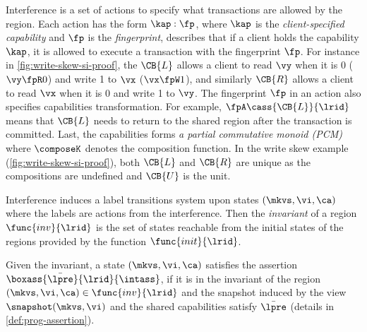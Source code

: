 Interference is a set of actions to specify what transactions are allowed by the region.
Each action has the form \( \kap : \fp \),
where \( \kap \) is the \emph{client-specified capability} and \( \fp \) is the \emph{fingerprint},
describes that if a client holds the capability \( \kap \), 
it is allowed to execute a transaction with the fingerprint \( \fp \).
For instance in \cref{fig:write-skew-si-proof}, 
the \( \CB{L}\) allows a client to read \( \vy \) when it is 0 (\(\vy \fpR 0\)) and write 1 to \( \vx \) (\(\vx \fpW 1\)),
and similarly \( \CB{R} \) allows a client to read \( \vx \) when it is 0 and write 1 to \( \vy \).
The fingerprint \( \fp \) in an action also specifies capabilities transformation.
For example, \( \null \fpA \cass{\CB{L}}{\lrid} \) means that \( \CB{L} \) needs to return to the shared region after the transaction is committed.
Last, the capabilities forms \emph{a partial commutative monoid (PCM)} where \( \composeK \) denotes the composition function.
In the write skew example (\cref{fig:write-skew-si-proof}), 
both \( \CB{L} \) and \( \CB{R} \) are unique as the compositions are undefined and \( \CB{U} \) is the unit.

Interference induces a label transitions system upon states \( (\mkvs, \vi, \ca) \)
where the labels are actions from the interference.
Then the \emph{invariant} of a region \( \func{inv}{\lrid} \) is the set of states reachable from 
the initial states of the regions provided by the function \( \func{init}{\lrid}\).

Given the invariant, a state \( (\mkvs, \vi, \ca) \) satisfies the assertion \( \boxass{\bar{\lpre}}{\lrid}{\intass} \),
if it is in the invariant of the region \( (\mkvs, \vi, \ca) \in \func{inv}{\lrid} \) and the snapshot induced by the view \( \snapshot(\mkvs, \vi) \) and 
the shared capabilities satisfy \( \bar{\lpre} \) (details in \cref{def:prog-assertion}).

